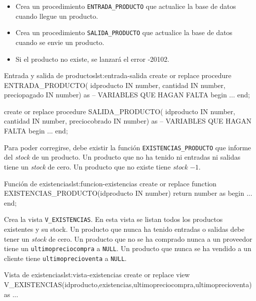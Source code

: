 \begin{homeworkProblem}

  \begin{itemize}
  \item Crea un procedimiento \texttt{ENTRADA\_PRODUCTO} que actualice la base de datos cuando llegue un producto.
  \item Crea un procedimiento \texttt{SALIDA\_PRODUCTO} que actualice la base de datos cuando se envie un producto.
  \item Si el producto no existe, se lanzará el error -20102.
  \end{itemize}


  
  \begin{listadosql}{Entrada y salida de productos}{lst:entrada-salida}
create or replace procedure ENTRADA_PRODUCTO(
  idproducto IN number,
  cantidad IN number,
  preciopagado IN number)
as
  -- VARIABLES QUE HAGAN FALTA
begin
  ...
end; 

create or replace procedure SALIDA_PRODUCTO(
  idproducto IN number,
  cantidad IN number,
  preciocobrado IN number)
as
  -- VARIABLES QUE HAGAN FALTA
begin
  ...
end; 
  \end{listadosql}


  
  Para poder corregirse, debe existir la función \texttt{EXISTENCIAS\_PRODUCTO} que informe del \textit{stock} de un producto. Un producto que no ha tenido ni entradas ni salidas tiene un \textit{stock} de cero. Un producto que no existe tiene \textit{stock} $-1$.

  \begin{listadosql}{Función de existencias}{lst:funcion-existencias}
create or replace function EXISTENCIAS_PRODUCTO(idproducto IN number) return number
as
begin
  ...
end; 
  \end{listadosql}  
  


\end{homeworkProblem}

\begin{homeworkProblem}

  Crea la vista \texttt{V\_EXISTENCIAS}. En esta vista se listan todos los productos existentes y su stock. Un producto que nunca ha tenido entradas o salidas debe tener un \textit{stock} de cero. Un producto que no se ha comprado nunca a un proveedor tiene un \texttt{ultimopreciocompra} a \texttt{NULL}. Un producto que nunca se ha vendido a un cliente tiene \texttt{ultimoprecioventa} a \texttt{NULL}.

  \begin{listadosql}{Vista de existencias}{lst:vista-existencias}
create or replace view V_EXISTENCIAS(idproducto,existencias,ultimopreciocompra,ultimoprecioventa) as
...
  \end{listadosql}  
  
\end{homeworkProblem}



